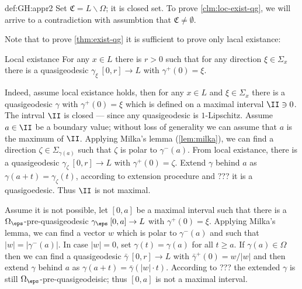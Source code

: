 {\begin{subthm}{def:GH:appr2}
Set $\mathfrak C=L\backslash \Omega$;
it is closed set. 
To prove \ref{clm:loc-exist-qg}, we will arrive to a contradiction with assumbtion that $\mathfrak C\not=\emptyset$.























Note that to prove \ref{thm:exist-qg} it is sufficient to prove only lacal existance:

\begin{thm}{Local existance}\label{clm:loc-exist-qg} For any $x\in L$ there is $r>0$ such that for any direction $\xi\in\Sigma_x$ there is a quasigeodesic $\gamma_\xi\:[0,r]\to L$ with $\gamma^+(0)=\xi$.
\end{thm}

Indeed, assume local existance holds, then for any $x\in L$ and $\xi\in\Sigma_x$ there is a quasigeodesic $\gamma$ with $\gamma^+(0)=\xi$ which is defined on a maximal interval $\II\ni 0$.
The intrval $\II$ is closed --- since any quasigeodesic is $1$-Lipschitz.
Assume $a\in \II$ be a boundary value;
without loss of generality we can assume that $a$ is the maximum of $\II$.
Applying Milka's lemma (\ref{lem:milka}), we can find a direction $\zeta\in \Sigma_{\gamma(a)}$ such that $\zeta$ is polar to $\gamma^-(a)$. 
From local existance, there is a quasigeodesic $\gamma_\zeta\:[0,r]\to L$ with $\gamma^+(0)=\zeta$.
Extend $\gamma$ behind $a$ as $\gamma(a+t)=\gamma_\zeta(t)$, according to extension procedure and ??? it is a quasigoedesic.
Thus $\II$ is not maximal. \contradiction
























Assume it is not possible, let $[0,a]$ be a maximal interval such that there is a $\Omega_\eps$-pre-quasigeodesic $\gamma_\eps\:[0,a]\to L$ with $\gamma^+(0)=\xi$.
Applying Milka's lemma, we can find a vector $w$ which is polar to $\gamma^-(a)$ and such that $|w|=|\gamma^-(a)|$. In case $|w|=0$, set $\gamma(t)=\gamma(a)$ for all $t\ge a$.
If $\gamma(a)\in\Omega$ then we can find a quasigeodesic $\bar\gamma\:[0,r]\to L$ with $\bar\gamma^+(0)=w/|w|$ and then extend $\gamma$ behind $a$ as $\gamma(a+t)=\bar\gamma(|w|\cdot t)$.
According to ??? the extended $\gamma$ is still $\Omega_\eps$-pre-quasigeodeisic;
thus $[0,a]$ is not a maximal interval. \contradiction


\end{subthm}}
